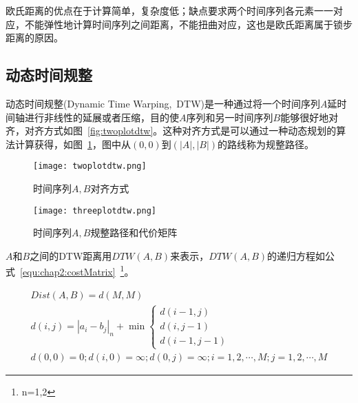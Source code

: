 欧氏距离的优点在于计算简单，复杂度低；缺点要求两个时间序列各元素一一对应，不能弹性地计算时间序列之间距离，不能扭曲对应，这也是欧氏距离属于锁步距离的原因。

%

\subsection{动态时间规整}
\label{cha:chap02:dtw}


动态时间规整\cite{muller2007dynamic}(Dynamic Time Warping,~DTW)是一种通过将一个时间序列$A$延时间轴进行非线性的延展或者压缩，目的使$A$序列和另一时间序列$B$能够很好地对齐，对齐方式如图~\ref{fig:twoplotdtw}。这种对齐方式是可以通过一种动态规划的算法计算获得，如图~\ref{fig:threeplotdtw}，图中从$(0,0)$到$(|A|,|B|)$的路线称为规整路径。

\begin{figure}
	\begin{minipage}{0.48\textwidth}
		\centering
		\texttt{[image: twoplotdtw.png]}
		\caption{时间序列$A,B$对齐方式}
		\label{fig:twoplotdtw}
	\end{minipage}\hfill
	\begin{minipage}{0.48\textwidth}
		\centering
		\texttt{[image: threeplotdtw.png]}
		\caption{时间序列$A,B$规整路径和代价矩阵}
		\label{fig:threeplotdtw}
	\end{minipage}
\end{figure}

$A$和$B$之间的DTW距离用$DTW(A,B)$来表示，$DTW(A,B)$的递归方程如公式~\ref{equ:chap2:costMatrix}~\cite{sart2010accelerating}\footnote{n=1,2}。

\begin{equation}
\label{equ:chap2:costMatrix}
\begin{array}{l}
Dist(A,B) = d(M,M) \\ [0.3cm]
d(i,j) = |a_i-b_j|_n + \min
\begin{cases}
d(i-1,j)\\
d(i,j-1)\\
d(i-1,j-1)
\end{cases}\\[0.2cm]
d(0,0)=0;d(i,0)=\infty;d(0,j)=\infty;i=1,2,\cdots,M;j=1,2,\cdots,M 
\end{array}
\end{equation}


